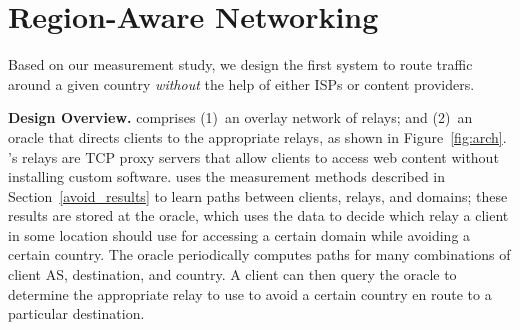 \section{Region-Aware Networking}
\label{system_design}


Based on our measurement study, we design the first system to route traffic
around a given country {\it without} the help of either ISPs or content providers.  






{\bf Design Overview.} \system{} comprises (1)~an overlay network of relays; and
(2)~an oracle that
directs clients to the appropriate relays, as shown in Figure~\ref{fig:arch}.
\system{}'s relays are TCP proxy servers that allow clients to access web
content without installing custom software. \system{} uses the measurement
methods described in Section~\ref{avoid_results} to learn paths between
clients, relays, and domains; these results are stored at the oracle, which
uses the data to decide which relay a client in some location should use for
accessing a certain domain while avoiding a certain country.  The oracle
periodically computes paths for many combinations of client AS, destination,
and country.   A client can then query the oracle to determine the appropriate
relay to use to avoid a certain country en route to a particular destination.

